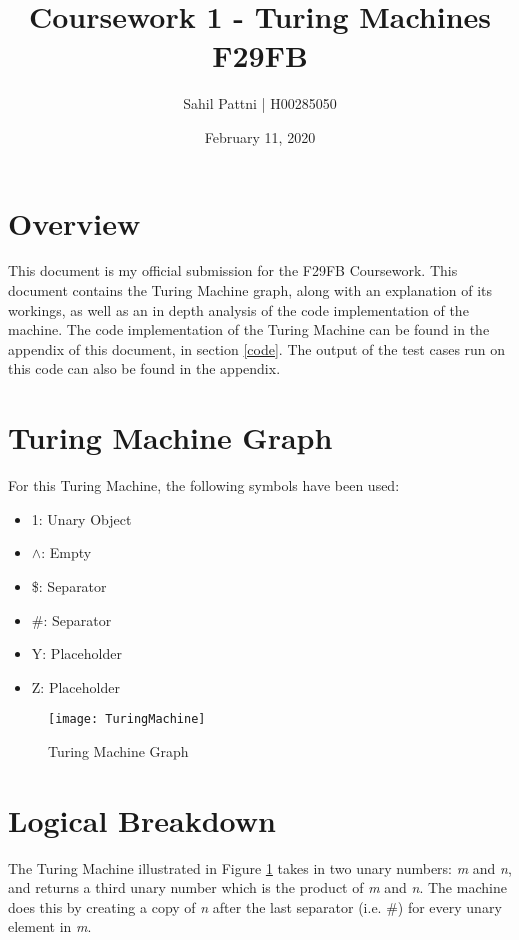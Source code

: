 \documentclass[a4paper,12pt]{article}
\begin{document}
\title{Coursework 1 - Turing Machines
\\ \large F29FB\\}
\author{Sahil Pattni | H00285050}
\date{February 11, 2020}
\maketitle
{}
\tableofcontents
\newpage
{}
\section{Overview}
This document is my official submission for the F29FB Coursework. This document contains the Turing Machine graph, along with an explanation of its workings, as well as an in depth analysis of the code implementation of the machine. 
\newline
The code implementation of the Turing Machine can be found in the appendix of this document, in section \ref{code}. The output of the test cases run on this code can also be found in the appendix.
\newpage
\section{Turing Machine Graph}
\label{graph}
For this Turing Machine, the following symbols have been used:
\begin{itemize}
	\item 1: Unary Object
	\item $\land$: Empty
	\item \$: Separator
	\item \#: Separator
	\item Y: Placeholder
	\item Z: Placeholder
\end{itemize}
\begin{figure}[H]
	\centering
		\texttt{[image: TuringMachine]}
	\caption{Turing Machine Graph}
	\label{fig:sec}
\end{figure}

\section{Logical Breakdown}
The Turing Machine illustrated in Figure \ref{fig:sec} takes in two unary numbers: \textit{m} and \textit{n}, and returns a third unary number which is the product of \textit{m} and \textit{n}.
The machine does this by creating a copy of \textit{n} after the last separator (i.e. \#) for every unary element in \textit{m}.
\end{document}
